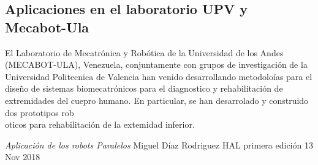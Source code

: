 \documentclass[letter,openrigh,12pt,spanish]{report}
\begin{document}
\subsection{Aplicaciones en el laboratorio UPV y Mecabot-Ula}

El Laboratorio de Mecatr\'onica y Rob\'otica de la Universidad de los Andes (MECABOT-ULA), Venezuela, conjuntamente con grupos de investigaci\'on de la Universidad Politecnica de Valencia han venido desarrollando metodolo\'ias para el dise\~no de sistemas biomecatr\'onicos para el diagnostico y rehabilitaci\'on de extremidades del cuepro humano. En particular, se han desarrolado y construido dos prototipos rob\\oticos para rehabilitaci\'on de la extemidad inferior.

\begin{thebibliography}{x}
 \textit{Aplicaci\'on de los robots Paralelos} Miguel D\'iaz Rodriguez \textsc{HAL} primera edici\'on 13 Nov 2018 
\end{thebibliography}
\end{document}
